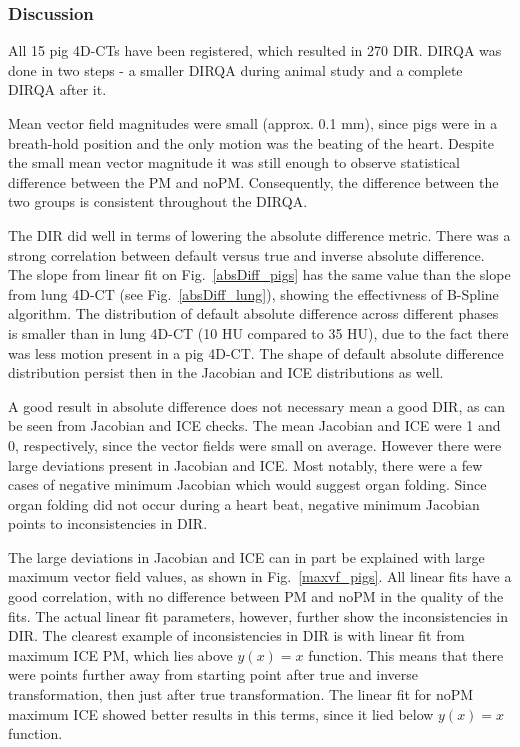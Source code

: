 \subsubsection{Discussion}

All 15 pig 4D-CTs have been registered, which resulted in 270 DIR. DIRQA was done in two steps - a smaller DIRQA during animal study and a complete DIRQA after it.

Mean vector field magnitudes were small (approx. 0.1 mm), since pigs were in a breath-hold position and the only motion was the beating of the heart. 
Despite the small mean vector magnitude it was still enough to observe statistical difference between the PM and noPM.
Consequently, the difference between the two groups is consistent throughout the DIRQA.

The DIR did well in terms of lowering the absolute difference metric. There was a strong correlation between default versus true and inverse absolute difference. 
The slope from linear fit on Fig.~\ref{absDiff_pigs} has the same value than the slope from lung 4D-CT (see Fig.~\ref{absDiff_lung}), showing
the effectivness of B-Spline algorithm. The distribution of default absolute difference across different phases is smaller than in lung 4D-CT (10 HU compared to 35 HU), due to the fact
there was less motion present in a pig 4D-CT. The shape of default absolute difference
distribution persist then in the Jacobian and ICE distributions as well. 

A good result in absolute difference does not necessary mean a good DIR, as can be seen from Jacobian and ICE checks. The mean Jacobian and ICE were 1 and 0, respectively, since the
vector fields were small on average. However there were large deviations present in Jacobian and ICE. Most notably, there were a few cases of negative minimum Jacobian which would suggest 
organ folding. Since organ folding did not occur during a heart beat, negative minimum Jacobian points to inconsistencies in DIR. 

The large deviations in Jacobian and ICE can in part be explained with large maximum vector field values, as shown in Fig.~\ref{maxvf_pigs}. All linear fits have a good correlation, with no
difference between PM and noPM in the quality of the fits. The actual linear fit parameters, however, further show the inconsistencies in DIR. The clearest example of inconsistencies in
DIR is with linear fit from maximum ICE PM, which lies above $y(x)=x$ function. This means that there were points further away from starting point after true and inverse transformation, 
then just after true transformation. The linear fit for noPM maximum ICE showed better results in this terms, since it lied below $y(x)=x$ function.


